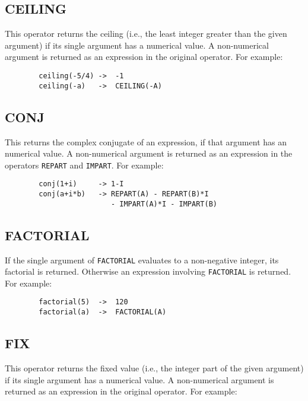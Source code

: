 \subsection{CEILING}
\hypertarget{operator:CEILING}{}
This operator returns the ceiling (i.e., the least integer greater than
the given argument) if its single argument has a numerical value.  A
non-numerical argument is returned as an expression in the original
operator.  For example:

\begin{verbatim}
        ceiling(-5/4) ->  -1
        ceiling(-a)   ->  CEILING(-A)
\end{verbatim}

\subsection{CONJ}
\hypertarget{operator:CONJ}{}
This returns the complex conjugate
of an expression, if that argument has an numerical value.  A
non-numerical argument is returned as an expression in the operators
\texttt{REPART} and \texttt{IMPART}. For example:
\begin{verbatim}
        conj(1+i)     -> 1-I
        conj(a+i*b)   -> REPART(A) - REPART(B)*I
                         - IMPART(A)*I - IMPART(B)
\end{verbatim}

\subsection{FACTORIAL}
\hypertarget{operator:FACTORIAL}{}

If the single argument of \texttt{FACTORIAL} evaluates to a non-negative
integer, its factorial is returned.  Otherwise an expression involving
\texttt{FACTORIAL} is returned. For example:
\begin{verbatim}
        factorial(5)  ->  120
        factorial(a)  ->  FACTORIAL(A)
\end{verbatim}

\subsection{FIX}
\hypertarget{operator:FIX}{}
This operator returns the fixed value (i.e., the integer part of
the given argument) if its single argument has a numerical value.  A
non-numerical argument is returned as an expression in the original
operator.  For example:

